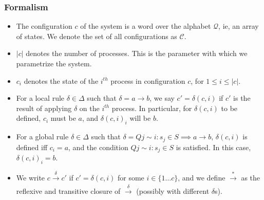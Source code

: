 \documentclass{beamer}
\begin{document}
{        \begin{frame}
            \frametitle{Formalism}
            \begin{itemize}
                \item The configuration $c$ of the system is a word over the alphabet $\mathcal{Q}$, ie, an array of states. We denote the set of all configurations as $\mathcal{C}$.
                \item $\left|c\right|$ denotes the number of processes. This is the parameter with which we parametrize the system.
                \item $c_{i}$ denotes the state of the $i^{th}$ process in configuration $c$, for $1 \leq i \leq \left|c\right|$.
                \item For a local rule $\delta \in \Delta$ such that $\delta = a \rightarrow b$, we say $c' = \delta(c, i)$ if $c'$ is the result of applying $\delta$ on the $i^{th}$ process.
                In particular, for $\delta(c, i)$ to be defined, $c_{i}$ must be $a$, and $\delta(c, i)_{i}$ will be $b$.
                \item For a global rule $\delta \in \Delta$ such that $\delta = Q j \sim i: s_{j} \in S \implies a \rightarrow b$, $\delta(c, i)$ is defined iff $c_{i} = a$, and the condition $Q j \sim i: s_{j} \in S$ is satisfied. In this case, $\delta(c, i)_{i} = b$.
                \item We write $c \xrightarrow[]{\delta} c'$ if $c' = \delta(c, i)$ for some $i \in \{1 \dots c\}$, and we define $\xrightarrow[]{*}$ as the reflexive and transitive closure of $\xrightarrow[]{\delta}$ (possibly with different $\delta$s).
            \end{itemize}
        \end{frame}

}
\end{document}
